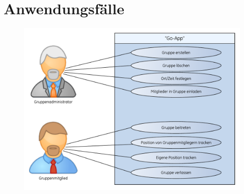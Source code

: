 \section{Anwendungsfälle}
\begin{figure} [H]
	\centering
	\includegraphics[scale=0.8, trim=2cm 0 0 0cm]{res/anwendungsfall.pdf}
\end{figure}
%
